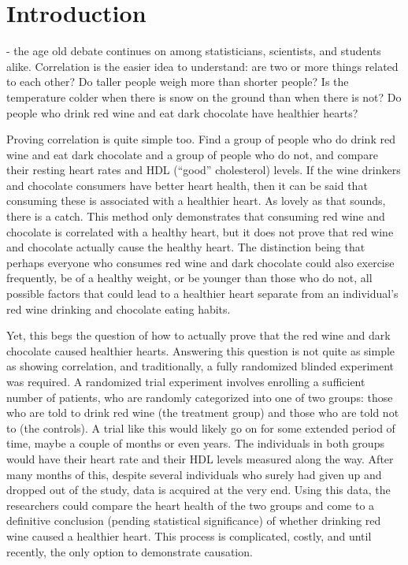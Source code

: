 \chapter{Introduction}
\label{introduction}

 - the age old debate continues on among statisticians, scientists, and students alike.  Correlation is the easier idea to understand: are two or more things related to each other?  Do taller people weigh more than shorter people?  Is the temperature colder when there is snow on the ground than when there is not?  Do people who drink red wine and eat dark chocolate have healthier hearts? 

Proving correlation is quite simple too.  Find a group of people who do drink red wine and eat dark chocolate and a group of people who do not, and compare their resting heart rates and HDL (``good'' cholesterol) levels.  If the wine drinkers and chocolate consumers have better heart health, then it can be said that consuming these is associated with a healthier heart.  As lovely as that sounds, there is a catch.  This method only demonstrates that consuming red wine and chocolate is correlated with a healthy heart, but it does not prove that red wine and chocolate actually cause the healthy heart.  The distinction being that perhaps everyone who consumes red wine and dark chocolate could also exercise frequently,  be of a healthy weight, or be younger than those who do not, all possible factors that could lead to a healthier heart separate from an individual's red wine drinking and chocolate eating habits.  
 
 Yet, this begs the question of how to actually prove that the red wine and dark chocolate caused healthier hearts.  Answering this question is not quite as simple as showing correlation, and traditionally, a fully randomized blinded experiment was required.  A randomized trial experiment involves enrolling a sufficient number of patients, who are randomly categorized into one of two groups: those who are told to drink red wine (the treatment group) and those who are told not to (the controls).  A trial like this would likely go on for some extended period of time, maybe a couple of months or even years.  The individuals in both groups would have their heart rate and their HDL levels measured along the way.  After many months of this, despite several individuals who surely had given up and dropped out of the study, data is acquired at the very end.  Using this data, the researchers could compare the heart health of the two groups and come to a definitive conclusion (pending statistical significance) of whether drinking red wine caused a healthier heart.  This process is complicated, costly, and until recently, the only option to demonstrate causation.  
 
